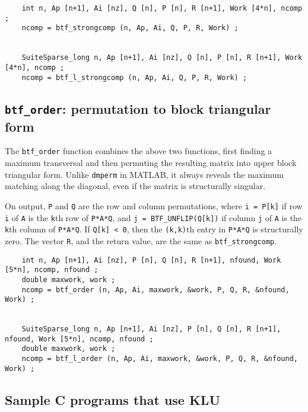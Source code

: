 \documentclass[11pt]{article}
\begin{document}
{\footnotesize
\begin{verbatim}
    int n, Ap [n+1], Ai [nz], Q [n], P [n], R [n+1], Work [4*n], ncomp ;
    ncomp = btf_strongcomp (n, Ap, Ai, Q, P, R, Work) ;


    SuiteSparse_long n, Ap [n+1], Ai [nz], Q [n], P [n], R [n+1], Work [4*n], ncomp ;
    ncomp = btf_l_strongcomp (n, Ap, Ai, Q, P, R, Work) ;
\end{verbatim}
}

\subsection{{\tt btf\_order}: permutation to block triangular form}


The {\tt btf\_order} function combines the above two functions, first finding a
maximum transversal and then permuting the resulting matrix into upper block
triangular form.  Unlike {\tt dmperm} in MATLAB, it always reveals the maximum
matching along the diagonal, even if the matrix is structurally singular.

On output, {\tt P} and {\tt Q} are the row and column permutations, where
{\tt i = P[k]} if row {\tt i} of {\tt A} is the {\tt k}th row of {\tt P*A*Q},
and {\tt j = BTF\_UNFLIP(Q[k])} if column {\tt j} of {\tt A} is the {\tt k}th
column of {\tt P*A*Q}.  If {\tt Q[k] < 0}, then the {\tt (k,k)}th entry in
{\tt P*A*Q} is structurally zero.  The vector {\tt R}, and the return value,
are the same as {\tt btf\_strongcomp}.

{\footnotesize
\begin{verbatim}
    int n, Ap [n+1], Ai [nz], P [n], Q [n], R [n+1], nfound, Work [5*n], ncomp, nfound ;
    double maxwork, work ;
    ncomp = btf_order (n, Ap, Ai, maxwork, &work, P, Q, R, &nfound, Work) ;


    SuiteSparse_long n, Ap [n+1], Ai [nz], P [n], Q [n], R [n+1], nfound, Work [5*n], ncomp, nfound ;
    double maxwork, work ;
    ncomp = btf_l_order (n, Ap, Ai, maxwork, &work, P, Q, R, &nfound, Work) ;
\end{verbatim}
}

\subsection{Sample C programs that use KLU}
\end{document}
